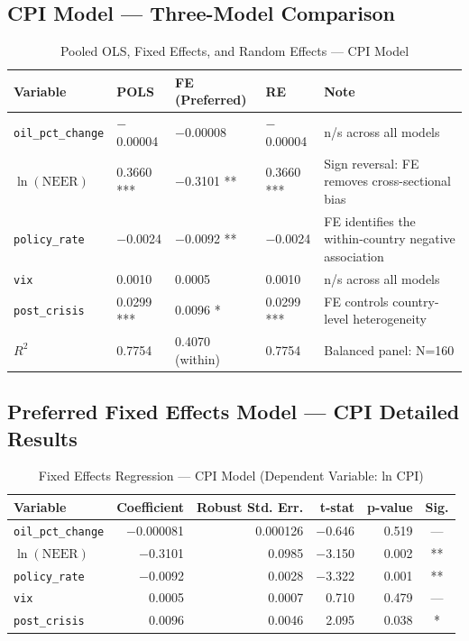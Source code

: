 \documentclass[11pt,a4paper]{article}
\newcommand{\tn}[1]{\par\vspace{2pt}{\small\itshape #1}\par\vspace{4pt}}
\begin{document}
\subsection{CPI Model --- Three-Model Comparison}
\begin{table}[H]
\caption{Pooled OLS, Fixed Effects, and Random Effects --- CPI Model}
\centering\small
\begin{tabular}{|p{2.9cm}|p{1.9cm}|p{2.3cm}|p{1.9cm}|p{4.3cm}|}
\hline
\textbf{Variable} & \textbf{POLS} & \textbf{FE (Preferred)} & \textbf{RE} & \textbf{Note}\\\hline
\texttt{oil\_pct\_change} & $-$0.00004 & $-$0.00008 & $-$0.00004 & n/s across all models\\\hline
$\ln(\text{NEER})$ & 0.3660 *** & $-$0.3101 ** & 0.3660 *** & Sign reversal: FE removes cross-sectional bias\\\hline
\texttt{policy\_rate} & $-$0.0024 & $-$0.0092 ** & $-$0.0024 & FE identifies the within-country negative association\\\hline
\texttt{vix} & 0.0010 & 0.0005 & 0.0010 & n/s across all models\\\hline
\texttt{post\_crisis} & 0.0299 *** & 0.0096 * & 0.0299 *** & FE controls country-level heterogeneity\\\hline
$R^2$ & 0.7754 & 0.4070 (within) & 0.7754 & Balanced panel: N=160\\\hline
\end{tabular}
\end{table}

\subsection{Preferred Fixed Effects Model --- CPI Detailed Results}
\begin{table}[H]
\caption{Fixed Effects Regression --- CPI Model (Dependent Variable: ln CPI)}
\centering\small
\begin{tabular}{|l|r|r|r|r|c|}
\hline
\textbf{Variable} & \textbf{Coefficient} & \textbf{Robust Std. Err.} & \textbf{t-stat} & \textbf{p-value} & \textbf{Sig.}\\\hline
\texttt{oil\_pct\_change} & $-$0.000081 & 0.000126 & $-$0.646 & 0.519 & ---\\\hline
$\ln(\text{NEER})$ & $-$0.3101 & 0.0985 & $-$3.150 & 0.002 & **\\\hline
\texttt{policy\_rate} & $-$0.0092 & 0.0028 & $-$3.322 & 0.001 & **\\\hline
\texttt{vix} & 0.0005 & 0.0007 & 0.710 & 0.479 & ---\\\hline
\texttt{post\_crisis} & 0.0096 & 0.0046 & 2.095 & 0.038 & *\\\hline
\end{tabular}
\tn{Entity fixed effects included. Arellano HAC robust SE. $R^2$ (within) = 0.407. N=160. ** $p<0.01$, * $p<0.05$.}
\end{table}
\end{document}
